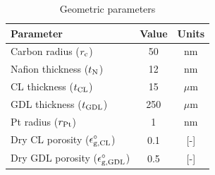 \documentclass[final,3p,times,onecolumn]{elsarticle}    %
\begin{document}
\begin{table}[!htb]
    \centering
    \caption{Geometric parameters}
    \begin{tabular}{l c c}
    \hline \hline
    Parameter                       &Value      &Units  \\
    \hline
    Carbon radius ($r_{\rm c}$)     &50         &nm     \\
    Nafion thickness ($t_{\rm N}$)  &12         &nm     \\
    CL thickness ($t_{\rm CL}$)     &15         &$\mu$m \\
    GDL thickness ($t_{\rm GDL}$)   &250        &$\mu$m \\
    Pt radius ($r_{\rm Pt}$)        &1          &nm     \\
    Dry CL porosity ($\epsilon_{\rm g,CL}^{\circ}$)   &0.1    &[-] \\
    Dry GDL porosity ($\epsilon_{\rm g,GDL}^{\circ}$)  &0.5    &[-] \\
    \hline \hline
    \end{tabular}
    \label{tab:geometry}
\end{table}
\end{document}
